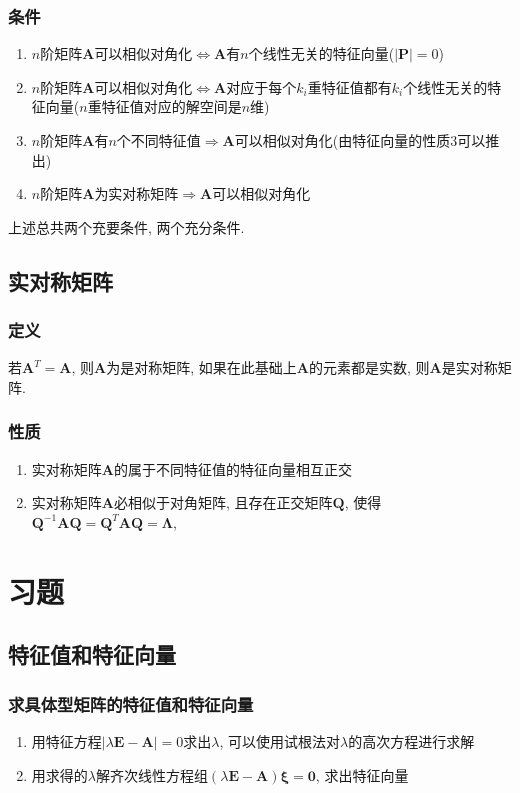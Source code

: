 \documentclass[oneside, onecolumn]{ctexbook}
\begin{document}
\subsubsection{条件}
\begin{enumerate}
	\item $ n $阶矩阵$ \bm{A} $可以相似对角化$ \Leftrightarrow $$ \bm{A} $有$ n $个线性无关的特征向量($ \left| \bm{P}\right| = 0$)
	\item $ n $阶矩阵$ \bm{A} $可以相似对角化$ \Leftrightarrow $$ \bm{A} $对应于每个$ k_i $重特征值都有$ k_i $个线性无关的特征向量($ n $重特征值对应的解空间是$ n $维)
	\item $ n $阶矩阵$ \bm{A} $有$ n $个不同特征值$ \Rightarrow $$ \bm{A} $可以相似对角化(由特征向量的性质3可以推出)
	\item $ n $阶矩阵$ \bm{A} $为实对称矩阵$ \Rightarrow $$ \bm{A} $可以相似对角化
\end{enumerate}\par
上述总共两个充要条件, 两个充分条件.
\subsection{实对称矩阵}
\subsubsection{定义}
若$ \bm{A}^T = \bm{A} $, 则$ \bm{A} $为是对称矩阵, 如果在此基础上$ \bm{A} $的元素都是实数, 则$ \bm{A} $是实对称矩阵.
\subsubsection{性质}
\begin{enumerate}
	\item 实对称矩阵$ \bm{A} $的属于不同特征值的特征向量相互正交
	\item 实对称矩阵$ \bm{A} $必相似于对角矩阵, 且存在正交矩阵$ \bm{Q} $, 使得$ \bm{Q}^{-1}\bm{A}\bm{Q}=\bm{Q}^{T}\bm{A}\bm{Q}=\bm{\Lambda}$,  
\end{enumerate}
\section{习题}
\subsection{特征值和特征向量}
\subsubsection{求具体型矩阵的特征值和特征向量}
\begin{enumerate}
	\item 用特征方程$ \left|\lambda \bm{E}-\bm{A}\right|=0 $求出$ \lambda $, 可以使用试根法对$ \lambda $的高次方程进行求解
	\item 用求得的$ \lambda $解齐次线性方程组$ (\lambda \bm{E}-\bm{A})\bm{\xi}=\bm{0} $, 求出特征向量
\end{enumerate}
\end{document}
